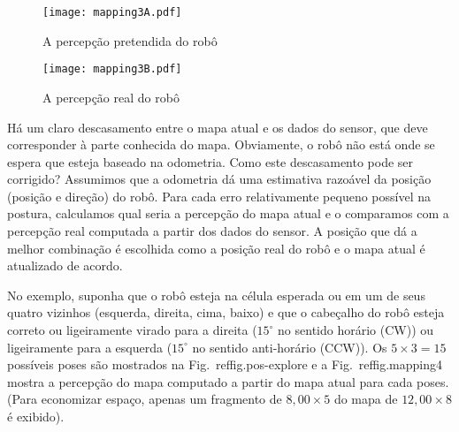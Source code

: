 \begin{figure}
\begin{minipage}{.45\textwidth}
\texttt{[image: mapping3A.pdf]}
\caption{A percepção pretendida do robô}
\label{fig.mapping3a}
\end{minipage}
\hspace{\fill}
\begin{minipage}{.45\textwidth}
\texttt{[image: mapping3B.pdf]}
\caption{A percepção real do robô}
\label{fig.mapping3b}
\end{minipage}
\end{figure}


Há um claro descasamento entre o mapa atual e os dados do sensor, que deve corresponder à parte conhecida do mapa. Obviamente, o robô não está onde se espera que esteja baseado na odometria. Como este descasamento pode ser corrigido? Assumimos que a odometria dá uma estimativa razoável da posição (posição e direção) do robô. Para cada erro relativamente pequeno possível na postura, calculamos qual seria a percepção do mapa atual e o comparamos com a percepção real computada a partir dos dados do sensor. A posição que dá a melhor combinação é escolhida como a posição real do robô e o mapa atual é atualizado de acordo.

No exemplo, suponha que o robô esteja na célula esperada ou em um de seus quatro vizinhos (esquerda, direita, cima, baixo) e que o cabeçalho do robô esteja correto ou ligeiramente virado para a direita ($15^\circ$ no sentido horário (CW)) ou ligeiramente para a esquerda ($15^\circ$ no sentido anti-horário (CCW)). Os $5\times 3=15$ possíveis poses são mostrados na Fig.~ref{fig.pos-explore} e a Fig.~ref{fig.mapping4} mostra a percepção do mapa computado a partir do mapa atual para cada poses. (Para economizar espaço, apenas um fragmento de $8,00\times 5$ do mapa de $12,00\times 8$ é exibido).

